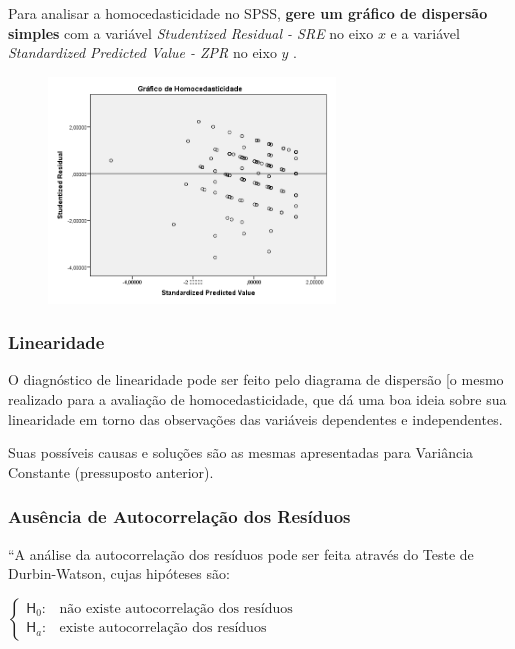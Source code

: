 			\bigskip

			Para analisar a homocedasticidade no SPSS, \textbf{gere um gráfico de dispersão simples} com a variável \emph{Studentized Residual - SRE} no eixo $ x $ e a variável \emph{Standardized Predicted Value - ZPR} no eixo $ y $ .

			\begin{figure}[H]
				\centering
				\includegraphics[height=6cm]{images/rl_homocedasticidade}
			\end{figure}

		\subsubsection{Linearidade}

			O diagnóstico de linearidade pode ser feito pelo diagrama de dispersão [o mesmo realizado para a avaliação de homocedasticidade, que dá uma boa ideia sobre sua linearidade em torno das observações das variáveis dependentes e independentes.

			\bigskip
			
			Suas possíveis causas e soluções são as mesmas apresentadas para Variância Constante (pressuposto anterior).

		\subsubsection{Ausência de Autocorrelação dos Resíduos}

			``A análise da autocorrelação dos resíduos pode ser feita através do Teste de Durbin-Watson, cujas hipóteses são:
			
			\bigskip

				$
					\begin{cases}
					\mathsf{H}_{0} : & \text{não existe autocorrelação dos resíduos} \\
					\mathsf{H}_{a} : & \text{existe autocorrelação dos resíduos}
					\end{cases}
				$

